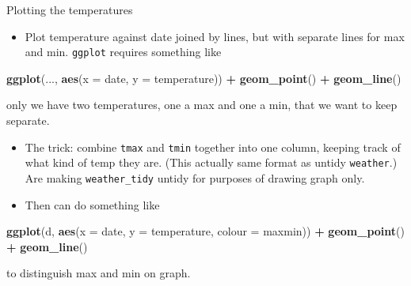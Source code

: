 \documentclass[ignorenonframetext,]{beamer}
\newenvironment{Shaded}{\begin{snugshade}}{\end{snugshade}}
\newcommand{\DataTypeTok}[1]{\textcolor[rgb]{0.13,0.29,0.53}{#1}}
\newcommand{\KeywordTok}[1]{\textcolor[rgb]{0.13,0.29,0.53}{\textbf{#1}}}
\newcommand{\NormalTok}[1]{#1}
\newcommand{\OperatorTok}[1]{\textcolor[rgb]{0.81,0.36,0.00}{\textbf{#1}}}
\newcommand{\StringTok}[1]{\textcolor[rgb]{0.31,0.60,0.02}{#1}}
\providecommand{\tightlist}{%
  \setlength{\itemsep}{0pt}\setlength{\parskip}{0pt}}
\begin{document}
\begin{frame}[fragile]{Plotting the temperatures}
\protect\hypertarget{plotting-the-temperatures}{}

\begin{itemize}
\tightlist
\item
  Plot temperature against date joined by lines, but with separate lines
  for max and min. \texttt{ggplot} requires something like
\end{itemize}

\footnotesize

\begin{Shaded}
\begin{Highlighting}[]
\KeywordTok{ggplot}\NormalTok{(..., }\KeywordTok{aes}\NormalTok{(}\DataTypeTok{x =}\NormalTok{ date, }\DataTypeTok{y =}\NormalTok{ temperature)) }\OperatorTok{+}\StringTok{ }\KeywordTok{geom_point}\NormalTok{() }\OperatorTok{+}\StringTok{ }
\StringTok{  }\KeywordTok{geom_line}\NormalTok{()}
\end{Highlighting}
\end{Shaded}

\normalsize

only we have two temperatures, one a max and one a min, that we want to
keep separate.

\begin{itemize}
\tightlist
\item
  The trick: combine \texttt{tmax} and \texttt{tmin} together into one
  column, keeping track of what kind of temp they are. (This actually
  same format as untidy \texttt{weather}.) Are making
  \texttt{weather\_tidy} untidy for purposes of drawing graph only.
\item
  Then can do something like
\end{itemize}

\footnotesize

\begin{Shaded}
\begin{Highlighting}[]
\KeywordTok{ggplot}\NormalTok{(d, }\KeywordTok{aes}\NormalTok{(}\DataTypeTok{x =}\NormalTok{ date, }\DataTypeTok{y =}\NormalTok{ temperature, }\DataTypeTok{colour =}\NormalTok{ maxmin)) }
  \OperatorTok{+}\StringTok{ }\KeywordTok{geom_point}\NormalTok{() }\OperatorTok{+}\StringTok{ }\KeywordTok{geom_line}\NormalTok{()}
\end{Highlighting}
\end{Shaded}

\normalsize

to distinguish max and min on graph.

\end{frame}
\end{document}
